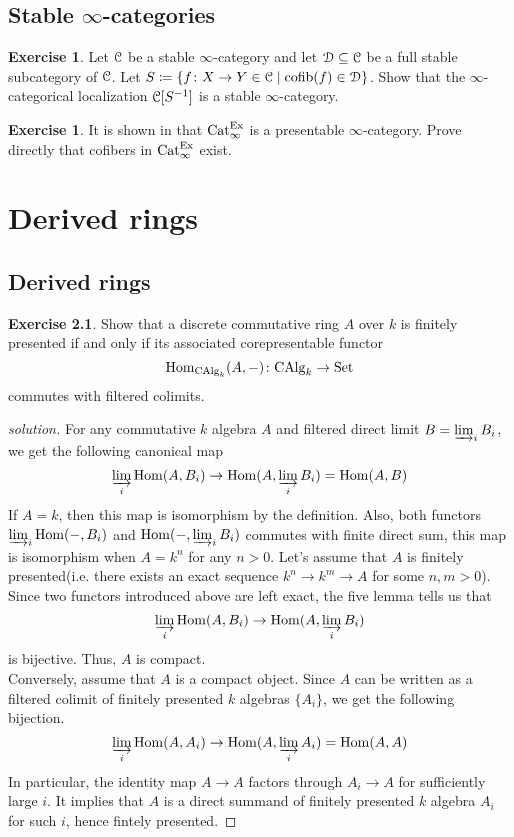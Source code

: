 \documentclass[10pt,a4paper,reqno,oneside]{book} %
\theoremstyle{plain}
\theoremstyle{definition}
\newtheorem{exercise}[thm]{Exercise}
\theoremstyle{remark}
\numberwithin{equation}{section}
\begin{document}
\section{Stable $\infty$-categories}

\begin{exercise}
	Let $\mathcal C$ be a stable $\infty$-category and let $\mathcal D \subseteq \mathcal C$ be a full stable subcategory of $\mathcal C$.
	Let $S \coloneqq \{f \colon X \to Y \in \mathcal C \mid \mathrm{cofib}(f) \in \mathcal D\}$.
	Show that the $\infty$-categorical localization $\mathcal C[S^{-1}]$ is a stable $\infty$-category.
\end{exercise}

\begin{exercise}
	It is shown in \cite{Blumberg_Gepner_Universal_2013} that $\mathrm{Cat}_\infty^{\mathrm{Ex}}$ is a presentable $\infty$-category.
	Prove directly that cofibers in $\mathrm{Cat}_\infty^{\mathrm{Ex}}$ exist.
\end{exercise}

\chapter{Derived rings}

\section{Derived rings}

\begin{exercise}
	Show that a discrete commutative ring $A$ over $k$ is finitely presented if and only if its associated corepresentable functor
	\[ \operatorname{Hom}_{\mathrm{CAlg}_k}(A,-) \colon \mathrm{CAlg}_k \to \mathrm{Set} \]
	commutes with filtered colimits.
\end{exercise}

\ifpersonal
\begin{proof}[solution]
For any commutative $k$ algebra $A$ and filtered direct limit $B=\varinjlim_{i}B_{i}$, we get the following canonical map\[\varinjlim_{i}\operatorname{Hom}(A,B_i) \to \operatorname{Hom}(A, \varinjlim_{i}B_i)= \operatorname{Hom}(A,B) \]
If $A=k$, then this map is isomorphism by the definition. Also, both functors $\varinjlim_{i}\operatorname{Hom}(-,B_i)$ and $\operatorname{Hom}(-, \varinjlim_{i}B_i)$ commutes with finite direct sum, this map is isomorphism when $A=k^n$ for any $n>0$.
Let's assume that $A$ is finitely presented(i.e. there exists an exact sequence $k^n \to k^m \to A$ for some $n,m>0$). Since two functors introduced above are left exact, the five lemma tells us that \[\varinjlim_{i}\operatorname{Hom}(A,B_i) \to \operatorname{Hom}(A, \varinjlim_{i}B_i)\] is bijective. Thus, $A$ is compact.\\
Conversely, assume that $A$ is a compact object. Since $A$ can be written as a filtered colimit of finitely presented $k$ algebras $\{A_i\}$, we get the following bijection.
\[\varinjlim_{i}\operatorname{Hom}(A,A_i) \to \operatorname{Hom}(A, \varinjlim_{i}A_i)= \operatorname{Hom}(A,A) \] In particular, the identity map $A \to A$ factors through $A_i \to A$ for sufficiently large $i$. It implies that $A$ is a direct summand of finitely presented $k$ algebra $A_i$ for such $i$, hence fintely presented.

\end{proof}
\fi
\end{document}

